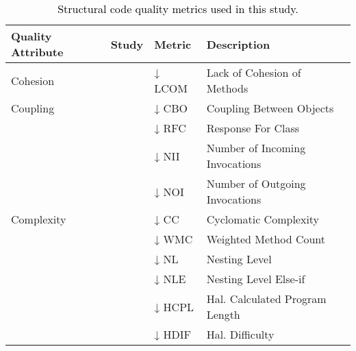 \begin{table}
  \centering
	 \caption{\textcolor{black}{Structural code quality metrics used in this study.}}
	 \label{Table:Quality Metrics Used in This Study.}
  \begin{threeparttable}
\begin{adjustbox}{width=1.0\textwidth,center}
\begin{tabular}{llll}\hline
\toprule
\bfseries Quality Attribute & \bfseries Study &   \bfseries Metric & \bfseries Description \\
\midrule
Cohesion & \cite{pantiuchina2018improving,chavez2017does} &↓ LCOM& Lack of Cohesion of Methods   \\ 
Coupling &  \cellcolor{gray!30}\cite{chavez2017does,pantiuchina2018improving} & \cellcolor{gray!30}↓ CBO&\cellcolor{gray!30}Coupling Between Objects    \\
         & \cite{pantiuchina2018improving} & ↓ RFC & Response For Class   \\
         & \cellcolor{gray!30}\cite{islam2018characteristics} & \cellcolor{gray!30}↓ NII &\cellcolor{gray!30}Number of Incoming Invocations  \\
         & \cite{islam2018characteristics} & ↓ NOI &Number of Outgoing Invocations \\
Complexity & \cellcolor{gray!30}\cite{chavez2017does} & \cellcolor{gray!30}↓ CC & \cellcolor{gray!30}Cyclomatic Complexity 
           \\
           & \cite{chavez2017does,pantiuchina2018improving,singh2012evaluation} & ↓ WMC& Weighted Method Count  \\
           & \cellcolor{gray!30}\cite{islam2018characteristics} & \cellcolor{gray!30}↓ NL & \cellcolor{gray!30}Nesting Level  \\
           & \cite{islam2018characteristics} & ↓ NLE &Nesting Level Else-if  \\
           & \cellcolor{gray!30}\cite{islam2018characteristics} & \cellcolor{gray!30}↓ HCPL & \cellcolor{gray!30}Hal. Calculated Program Length \\
            & \cite{islam2018characteristics} & ↓ HDIF & Hal. Difficulty  \\

\end{tabular}
\end{adjustbox}
\end{threeparttable}
\end{table}
